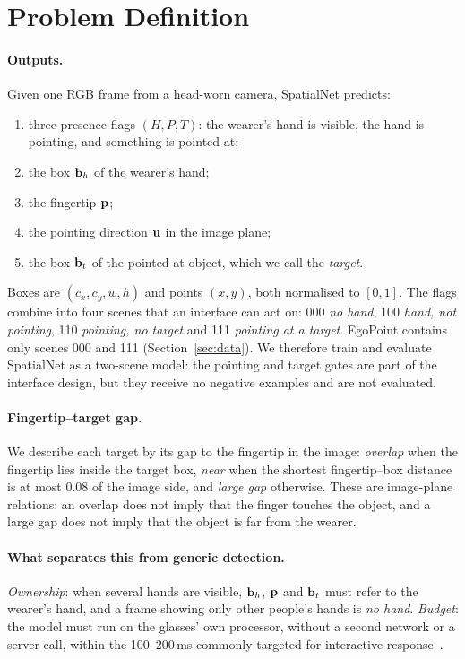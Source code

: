 \section{Problem Definition}\label{sec:problem}

\paragraph{Outputs.} Given one RGB frame from a head-worn camera, SpatialNet predicts:
\begin{enumerate}
\item three presence flags $(H,P,T)$: the wearer's hand is visible, the hand is pointing, and something is pointed at;
\item the box $\mathbf{b}_h$ of the wearer's hand;
\item the fingertip $\mathbf{p}$;
\item the pointing direction $\mathbf{u}$ in the image plane;
\item the box $\mathbf{b}_t$ of the pointed-at object, which we call the \emph{target}.
\end{enumerate}
Boxes are $(c_x,c_y,w,h)$ and points $(x,y)$, both normalised to $[0,1]$. The flags combine into four scenes that an interface can act on: 000 \emph{no hand}, 100 \emph{hand, not pointing}, 110 \emph{pointing, no target} and 111 \emph{pointing at a target}. EgoPoint contains only scenes 000 and 111 (Section~\ref{sec:data}). We therefore train and evaluate SpatialNet as a two-scene model: the pointing and target gates are part of the interface design, but they receive no negative examples and are not evaluated.

\paragraph{Fingertip--target gap.} We describe each target by its gap to the fingertip in the image: \emph{overlap} when the fingertip lies inside the target box, \emph{near} when the shortest fingertip--box distance is at most 0.08 of the image side, and \emph{large gap} otherwise. These are image-plane relations: an overlap does not imply that the finger touches the object, and a large gap does not imply that the object is far from the wearer.

\paragraph{What separates this from generic detection.} \emph{Ownership}: when several hands are visible, $\mathbf{b}_h$, $\mathbf{p}$ and $\mathbf{b}_t$ must refer to the wearer's hand, and a frame showing only other people's hands is \emph{no hand}. \emph{Budget}: the model must run on the glasses' own processor, without a second network or a server call, within the 100--200\,ms commonly targeted for interactive response~\cite{miller1968response,card1991information}.

